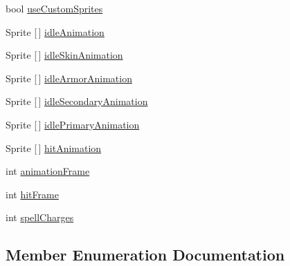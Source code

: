 \begin{DoxyCompactItemize}
\item 
bool \mbox{\hyperlink{class_base_unit_a6c81f225b4030b9f4d21f410f9667047}{use\+Custom\+Sprites}}
\item 
Sprite \mbox{[}$\,$\mbox{]} \mbox{\hyperlink{class_base_unit_ac788ccbe30dbb03b60008403b3f759be}{idle\+Animation}}
\item 
Sprite \mbox{[}$\,$\mbox{]} \mbox{\hyperlink{class_base_unit_a41adc9e3a4043cc54bc2f9f269958dbe}{idle\+Skin\+Animation}}
\item 
Sprite \mbox{[}$\,$\mbox{]} \mbox{\hyperlink{class_base_unit_a239013f506962f474a6727f628a4cb97}{idle\+Armor\+Animation}}
\item 
Sprite \mbox{[}$\,$\mbox{]} \mbox{\hyperlink{class_base_unit_a5f2fe899c267b8fce178fbb0869df8dd}{idle\+Secondary\+Animation}}
\item 
Sprite \mbox{[}$\,$\mbox{]} \mbox{\hyperlink{class_base_unit_a3affdf6931c127ef3caebd3c20a1fdfd}{idle\+Primary\+Animation}}
\item 
Sprite \mbox{[}$\,$\mbox{]} \mbox{\hyperlink{class_base_unit_a284caf011a396d4744a5acac8cbca7ea}{hit\+Animation}}
\item 
int \mbox{\hyperlink{class_base_unit_a8c9ffca53145b446f9f302c35b292401}{animation\+Frame}}
\item 
int \mbox{\hyperlink{class_base_unit_a0b593a2946a0fba083f407d51d8cc008}{hit\+Frame}}
\item 
int \mbox{\hyperlink{class_base_unit_a5efaee783f7a5504f36b62949634660a}{spell\+Charges}}
\end{DoxyCompactItemize}


\subsection{Member Enumeration Documentation}
\mbox{\label{class_base_unit_a4c855b587a2eecd744c4c511aeda7da1}} 
